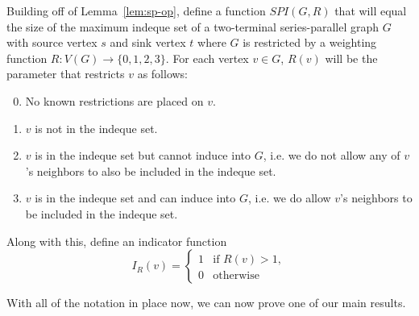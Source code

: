 \documentclass{article}
\newtheorem{prop}[thm]{Proposition}
\begin{document}

Building off of Lemma~\ref{lem:sp-op}, define a function $SPI(G, R)$ that will equal the size of the maximum indeque set of a two-terminal series-parallel graph $G$ with source vertex $s$ and sink vertex $t$ where $G$ is restricted by a weighting function $R: V(G) \to \{0,1,2,3\}$. For each vertex $v \in G$, $R(v)$ will be the parameter that restricts $v$ as follows: \begin{enumerate}
    \setcounter{enumi}{-1}
    \item No known restrictions are placed on $v$.
    \item $v$ is not in the indeque set.
    \item $v$ is in the indeque set but cannot induce into $G$, i.e. we do not allow any of $v$'s neighbors to also be included in the indeque set.
    \item $v$ is in the indeque set and can induce into $G$, i.e. we do allow $v$'s neighbors to be included in the indeque set.
\end{enumerate}

Along with this, define an indicator function 
\[I_R(v)=\begin{cases}
    1 & \text{if } R(v) > 1, \\
    0 & \text{otherwise}
\end{cases}\]

With all of the notation in place now, we can now prove one of our main results.
\end{document}
